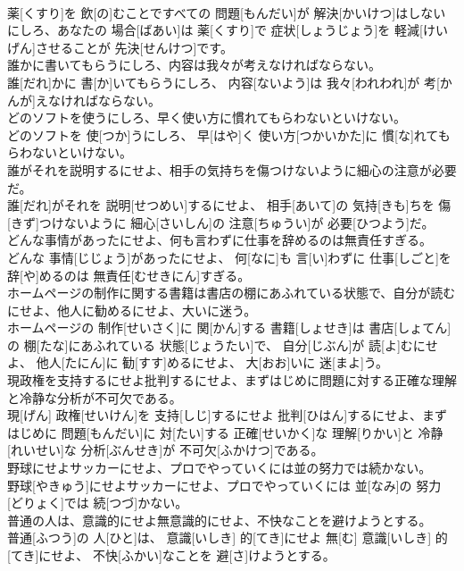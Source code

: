 \documentclass[8pt]{extreport}
\begin{document}
\begin{CJK}{UTF8}{min}
\\	薬[くすり]を 飲[の]むことですべての 問題[もんだい]が 解決[かいけつ]はしないにしろ、あなたの 場合[ばあい]は 薬[くすり]で 症状[しょうじょう]を 軽減[けいげん]させることが 先決[せんけつ]です。
\\	誰かに書いてもらうにしろ、内容は我々が考えなければならない。	
\\	誰[だれ]かに 書[か]いてもらうにしろ、 内容[ないよう]は 我々[われわれ]が 考[かんが]えなければならない。
\\	どのソフトを使うにしろ、早く使い方に慣れてもらわないといけない。	
\\	どのソフトを 使[つか]うにしろ、 早[はや]く 使い方[つかいかた]に 慣[な]れてもらわないといけない。
\\	誰がそれを説明するにせよ、相手の気持ちを傷つけないように細心の注意が必要だ。	
\\	誰[だれ]がそれを 説明[せつめい]するにせよ、 相手[あいて]の 気持[きも]ちを 傷[きず]つけないように 細心[さいしん]の 注意[ちゅうい]が 必要[ひつよう]だ。
\\	どんな事情があったにせよ、何も言わずに仕事を辞めるのは無責任すぎる。	
\\	どんな 事情[じじょう]があったにせよ、 何[なに]も 言[い]わずに 仕事[しごと]を 辞[や]めるのは 無責任[むせきにん]すぎる。
\\	ホームページの制作に関する書籍は書店の棚にあふれている状態で、自分が読むにせよ、他人に勧めるにせよ、大いに迷う。	
\\	ホームページの 制作[せいさく]に 関[かん]する 書籍[しょせき]は 書店[しょてん]の 棚[たな]にあふれている 状態[じょうたい]で、 自分[じぶん]が 読[よ]むにせよ、 他人[たにん]に 勧[すす]めるにせよ、 大[おお]いに 迷[まよ]う。
\\	現政権を支持するにせよ批判するにせよ、まずはじめに問題に対する正確な理解と冷静な分析が不可欠である。	
\\	現[げん] 政権[せいけん]を 支持[しじ]するにせよ 批判[ひはん]するにせよ、まずはじめに 問題[もんだい]に 対[たい]する 正確[せいかく]な 理解[りかい]と 冷静[れいせい]な 分析[ぶんせき]が 不可欠[ふかけつ]である。
\\	野球にせよサッカーにせよ、プロでやっていくには並の努力では続かない。	
\\	野球[やきゅう]にせよサッカーにせよ、プロでやっていくには 並[なみ]の 努力[どりょく]では 続[つづ]かない。
\\	普通の人は、意識的にせよ無意識的にせよ、不快なことを避けようとする。	
\\	普通[ふつう]の 人[ひと]は、 意識[いしき] 的[てき]にせよ 無[む] 意識[いしき] 的[てき]にせよ、 不快[ふかい]なことを 避[さ]けようとする。

\end{CJK}
\end{document}
